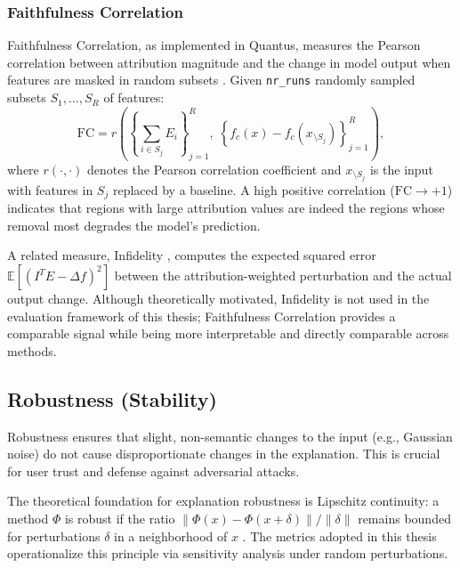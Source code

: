 \subsubsection{Faithfulness Correlation}
Faithfulness Correlation, as implemented in Quantus, measures the Pearson correlation between attribution magnitude and the change in model output when features are masked in random subsets \cite{hedstrom2023quantus}. Given \texttt{nr\_runs} randomly sampled subsets $S_1, \dots, S_R$ of features:
\begin{equation}
    \text{FC} = r\!\left(\left\{\sum_{i \in S_j} E_i\right\}_{j=1}^{R},\; \left\{f_c(x) - f_c(x_{\setminus S_j})\right\}_{j=1}^{R}\right),
\end{equation}
where $r(\cdot, \cdot)$ denotes the Pearson correlation coefficient and $x_{\setminus S_j}$ is the input with features in $S_j$ replaced by a baseline. A high positive correlation ($\text{FC} \to +1$) indicates that regions with large attribution values are indeed the regions whose removal most degrades the model's prediction.

A related measure, Infidelity \citep{yeh2019}, computes the expected squared error $\mathbb{E}[(I^T E - \Delta f)^2]$ between the attribution-weighted perturbation and the actual output change. Although theoretically motivated, Infidelity is not used in the evaluation framework of this thesis; Faithfulness Correlation provides a comparable signal while being more interpretable and directly comparable across methods.

\subsection{Robustness (Stability)}
\label{subsec:robustness}
Robustness ensures that slight, non-semantic changes to the input (e.g., Gaussian noise) do not cause disproportionate changes in the explanation. This is crucial for user trust and defense against adversarial attacks.

The theoretical foundation for explanation robustness is Lipschitz continuity: a method $\Phi$ is robust if the ratio $\|\Phi(x) - \Phi(x + \delta)\| / \|\delta\|$ remains bounded for perturbations $\delta$ in a neighborhood of $x$ \cite{alvarez2018robustness}. The metrics adopted in this thesis operationalize this principle via sensitivity analysis under random perturbations.


